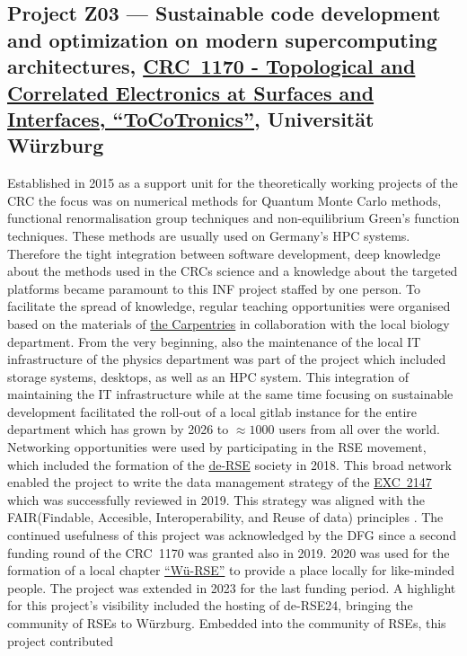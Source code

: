 \documentclass{eceasst}
\begin{document}
\subsection{Project Z03 --- Sustainable code development and optimization on modern supercomputing architectures, \href{https://gepris.dfg.de/gepris/projekt/258499086?language=en}{CRC~1170 - Topological and Correlated Electronics at Surfaces and Interfaces, ``ToCoTronics''}, Universität Würzburg}
Established in 2015 as a support unit for the theoretically working projects of the CRC the focus was on numerical methods for Quantum Monte Carlo methods, functional renormalisation group techniques and non-equilibrium Green's function techniques. These methods are usually used on
Germany's HPC systems. Therefore the tight integration between software development, deep knowledge about the methods used in the CRCs science and a knowledge about the targeted platforms became paramount to this INF project staffed by one person.
To facilitate the spread of knowledge, regular teaching opportunities were organised based on the materials of \href{https://carpentries.org/}{the Carpentries} in collaboration with the local biology department.
From the very beginning, also the maintenance of the local IT infrastructure of the physics department was part of the project which included
storage systems, desktops, as well as an HPC system.
This integration of maintaining the IT infrastructure while at the same time focusing on sustainable development
facilitated the roll-out of a local gitlab instance for the entire department which has grown by 2026 to $\approx 1000$ users from all
over the world. Networking opportunities were used by participating in the RSE movement, which included the formation of the \href{https://de-rse.org/de/index.html}{de-RSE} society in 2018.
This broad network enabled the project to write the data management strategy of the \href{https://www.ctdqmat.de/}{EXC~2147} which was successfully reviewed in 2019. This  strategy was aligned with the FAIR(Findable, Accesible, Interoperability, and Reuse of data) principles \cite{WilkinsonDumontier2016}.
The continued usefulness of this project was acknowledged by the DFG since a second funding round of the CRC~1170 was granted also in 2019.
2020 was used for the formation of a local chapter \href{https://de-rse.org/chapter/wue/}{``Wü-RSE''} to provide a place
locally for like-minded people. The project was extended in 2023 for the last funding period. A highlight for this project's visibility included the hosting of de-RSE24, bringing the community of RSEs to Würzburg. Embedded into the community of RSEs, this project contributed
\end{document}
